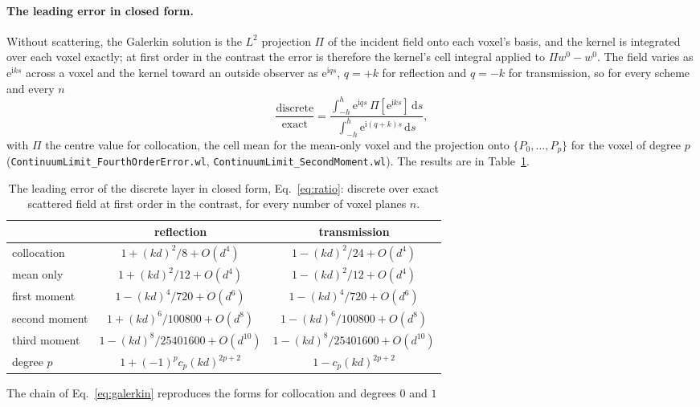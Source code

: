 \documentclass[11pt,a4paper]{article}
\newcommand{\nb}[1]{\texttt{#1}}
\newcommand{\dd}{\mathrm{d}}
\begin{document}
\paragraph{The leading error in closed form.} Without scattering, the Galerkin solution is the
$L^2$ projection $\Pi$ of the incident field onto each voxel's basis, and the kernel is integrated
over each voxel exactly; at first order in the contrast the error is therefore the kernel's cell
integral applied to $\Pi w^0-w^0$. The field varies as $\mathrm{e}^{\mathrm{i}ks}$ across a voxel and the kernel toward
an outside observer as $\mathrm{e}^{\mathrm{i}qs}$, $q=+k$ for reflection and $q=-k$ for transmission, so for every
scheme and every $n$
\begin{equation}\label{eq:ratio}
  \frac{\text{discrete}}{\text{exact}}
  =\frac{\int_{-h}^{h}\mathrm{e}^{\mathrm{i}qs}\,\Pi[\mathrm{e}^{\mathrm{i}ks}]\,\dd s}{\int_{-h}^{h}\mathrm{e}^{\mathrm{i}(q+k)s}\,\dd s},
\end{equation}
with $\Pi$ the centre value for collocation, the cell mean for the mean-only voxel and the projection
onto $\{P_0,\dots,P_p\}$ for the voxel of degree $p$ (\nb{ContinuumLimit\_FourthOrderError.wl},
\nb{ContinuumLimit\_SecondMoment.wl}). The results are in Table~\ref{tab:ratio}.
\begin{table}[htbp]
\centering
\caption{The leading error of the discrete layer in closed form, Eq.~\eqref{eq:ratio}: discrete over exact scattered field at first order in the contrast, for every number of voxel planes $n$.}\label{tab:ratio}
\begin{tabular}{@{}lcc@{}}
\toprule
 & reflection & transmission \\
\midrule
collocation      & $1+(kd)^2/8+O(d^4)$  & $1-(kd)^2/24+O(d^4)$ \\
mean only        & $1+(kd)^2/12+O(d^4)$ & $1-(kd)^2/12+O(d^4)$ \\
first moment     & $1-(kd)^4/720+O(d^6)$ & $1-(kd)^4/720+O(d^6)$ \\
second moment    & $1+(kd)^6/100800+O(d^8)$ & $1-(kd)^6/100800+O(d^8)$ \\
third moment     & $1-(kd)^8/25401600+O(d^{10})$ & $1-(kd)^8/25401600+O(d^{10})$ \\
degree $p$       & $1+(-1)^pc_p(kd)^{2p+2}$ & $1-c_p(kd)^{2p+2}$ \\
\bottomrule
\end{tabular}
\end{table}
The chain of Eq.~\eqref{eq:galerkin} reproduces the forms for collocation and degrees $0$ and $1$
\end{document}
